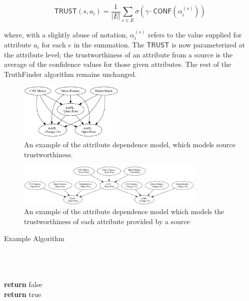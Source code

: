 \documentclass{acm_proc_article-sp}
\begin{document}
\begin{equation}
\mathsf{TRUST}(s,a_i) = \frac{1}{|E|} \sum_{e \in E} \sigma(\gamma \cdot \mathsf{CONF}(\alpha_i^{(s)}))
\end{equation}

where, with a slightly abuse of notation, $\alpha_i^{(s)}$ refers to the value supplied for attribute $a_i$ for each $e$ in the summation. The  $\mathsf{TRUST}$ is now parameterized at the attribute level; the trustworthiness of an attribute from a source is the average of the confidence values for those given attributes. The rest of the {\sc TruthFinder} algorithm remains unchanged. 


\begin{figure}
\centering
\includegraphics[width=5cm]{bn1.png}
\caption{An example of the attribute dependence model, which models source trustworthiness.}
\end{figure}

\begin{figure}
\centering
\includegraphics[width=9cm]{bn2.png}
\caption{An example of the attribute dependence model which models the trustworthiness of each attribute provided by a source}
\end{figure}

\begin{algorithm}[H]
\caption{Example Algorithm}
\begin{algorithmic}[1]
 \\
 \\
 \\


\State \textbf{return} false
\EndIf
\EndFor
\\

\State \textbf{return} true
\EndFunction
\end{algorithmic}
\end{algorithm}  



  

\balancecolumns
\end{document}
